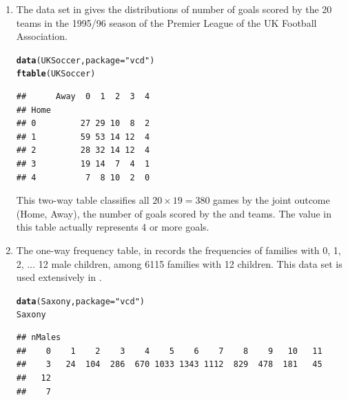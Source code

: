 \documentclass[11pt]{book}\usepackage[]{graphicx}\usepackage[]{color}
\makeatletter
\newcommand{\hlstr}[1]{\textcolor[rgb]{0.192,0.494,0.8}{#1}}%
\newcommand{\hlstd}[1]{\textcolor[rgb]{0.345,0.345,0.345}{#1}}%
\newcommand{\hlkwc}[1]{\textcolor[rgb]{0.333,0.667,0.333}{#1}}%
\newcommand{\hlkwd}[1]{\textcolor[rgb]{0.737,0.353,0.396}{\textbf{#1}}}%
\newenvironment{kframe}{%
 \def\at@end@of@kframe{}%
 \ifinner\ifhmode%
  \def\at@end@of@kframe{\end{minipage}}%
  \begin{minipage}{\columnwidth}%
 \fi\fi%
 \def\FrameCommand##1{\hskip\@totalleftmargin \hskip-\fboxsep
 \colorbox{shadecolor}{##1}\hskip-\fboxsep
     \hskip-\linewidth \hskip-\@totalleftmargin \hskip\columnwidth}%
 \MakeFramed {\advance\hsize-\width
   \@totalleftmargin\z@ \linewidth\hsize
   \@setminipage}}%
 {\par\unskip\endMakeFramed%
 \at@end@of@kframe}
\newenvironment{knitrout}{}{} %
\renewenvironment{knitrout}{\small\renewcommand{\baselinestretch}{.85}}{} %
\makeatother
\begin{document}
\begin{enumerate}
\item The data set  in  gives the distributions of
number of goals scored by the 20 teams in the  1995/96 season of the
Premier League of the UK Football Association.  
\begin{knitrout}
\color{fgcolor}\begin{kframe}
\begin{alltt}
\hlkwd{data}\hlstd{(UKSoccer,} \hlkwc{package}\hlstd{=}\hlstr{"vcd"}\hlstd{)}
\hlkwd{ftable}\hlstd{(UKSoccer)}
\end{alltt}
\begin{verbatim}
##      Away  0  1  2  3  4
## Home                    
## 0         27 29 10  8  2
## 1         59 53 14 12  4
## 2         28 32 14 12  4
## 3         19 14  7  4  1
## 4          7  8 10  2  0
\end{verbatim}
\end{kframe}
\end{knitrout}

This two-way table classifies all $20 \times 19 = 380$ games by the joint
outcome (Home, Away), the number of goals scored by the  and 
 teams.
The value  in this table actually represents 4 or more goals.


\item The one-way frequency table,  in  records the frequencies
of families with 0, 1, 2, $\dots$ 12 male children, among 6115 families with 12
children.  This data set is used extensively in .
\begin{knitrout}
\color{fgcolor}\begin{kframe}
\begin{alltt}
\hlkwd{data}\hlstd{(Saxony,} \hlkwc{package}\hlstd{=}\hlstr{"vcd"}\hlstd{)}
\hlstd{Saxony}
\end{alltt}
\begin{verbatim}
## nMales
##    0    1    2    3    4    5    6    7    8    9   10   11 
##    3   24  104  286  670 1033 1343 1112  829  478  181   45 
##   12 
##    7
\end{verbatim}
\end{kframe}
\end{knitrout}


\end{enumerate}
\end{document}
